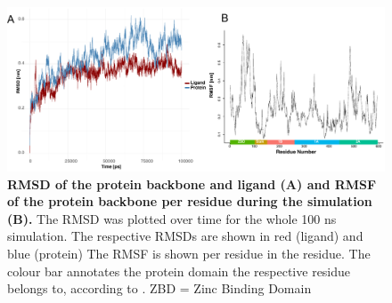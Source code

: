 \documentclass[11pt, letterpaper, titlepage]{article}
\begin{document}
\begin{figure}[h]
  \begin{center}
    \includegraphics[width=1.0\textwidth]{RMSD_RMSF_combined.pdf}
  \end{center}
  \caption{\textbf{RMSD of the protein backbone and ligand (A) and RMSF of the protein backbone per residue during the simulation (B).} The RMSD was plotted over time for the whole 100 ns simulation. The respective \acp{RMSD} are shown in red (ligand) and blue (protein) The RMSF is shown per residue in the residue. The colour bar annotates the protein domain the respective residue belongs to, according to \textcite{Domains}. ZBD = Zinc Binding Domain}
  \label{rms}
\end{figure}

\pagebreak
\FloatBarrier
\renewcommand{\bibname}{References}  %
\printbibliography
\end{document}
